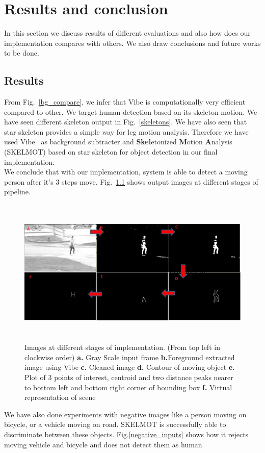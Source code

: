 \chapter{Results and conclusion} %
\label{Chapter4}
\indent In this section we discuss results of different evaluations and
also how does our implementation compares with others. We also draw
conclusions and future works to be done.
\section{Results}
\indent From Fig.~\ref{bg_compare}, we infer that Vibe is
computationally very efficient compared to other.  We target human
detection based on its skeleton motion. We have seen different skeleton
output in Fig.~\ref{skeletons}. We have also seen that star skeleton
provides a simple way for leg motion analysis. Therefore we have used
Vibe~\cite{9} as background subtracter and \textbf{Skel}etonized
\textbf{M}otion \textbf{A}nalysis (SKELMOT) based on star skeleton for
object detection in our final implementation.\\
\indent We conclude that with our implementation, system is able to
detect a moving person after it's 3 steps move.
Fig.~\ref{pipeline_images} shows output images at different stages of
pipeline.\\

\begin{figure}[!b]
\centering
\includegraphics[height=200pt]{Figures/pipeline_images}
\caption{Images at different stages of implementation. (From top left in
clockwise order) \textbf{a.} Gray Scale input frame
\textbf{b.}Foreground extracted image using Vibe \textbf{c.} Cleaned
image \textbf{d.} Contour of moving object \textbf{e.} Plot of 3 points
of interest, centroid and two distance peaks nearer to bottom left and
bottom right corner of bounding box \textbf{f.} Virtual representation
of scene} 
\label{pipeline_images}
\end{figure}
\indent We have also done experiments with negative images like a person
moving on bicycle, or a vehicle moving on road. SKELMOT is successfully able
to discriminate between these objects. Fig.\ref{negative_inputs} shows
how it rejects moving vehicle and bicycle and  does not detect them as
human.\\

